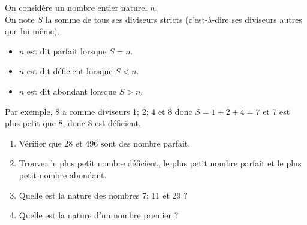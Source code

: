 \begin{colonne*exercice}
\begin{exercice}
   On considère un nombre entier naturel $n$. \\
   On note $S$ la somme de tous ses diviseurs stricts (c'est-à-dire ses diviseurs autres que lui-même). 
   \begin{itemize}
      \item $n$ est dit parfait lorsque $S=n$.
      \item $n$ est dit déficient lorsque $S<n$.
      \item $n$ est dit abondant lorsque $S>n$.
   \end{itemize}
   Par exemple, 8 a comme diviseurs 1; 2; 4 et 8 donc $S =1+2+4 =7$ et 7 est plus petit que 8, donc 8 est déficient.
   \begin{enumerate}
      \item Vérifier que 28 et 496 sont des nombre parfait.
      \item Trouver le plus petit nombre déficient, le plus petit nombre parfait et le plus petit nombre abondant.
      \item Quelle est la nature des nombres 7; 11 et 29 ?
      \item Quelle est la nature d'un nombre premier ?
   \end{enumerate}
\end{exercice}


\end{colonne*exercice}

